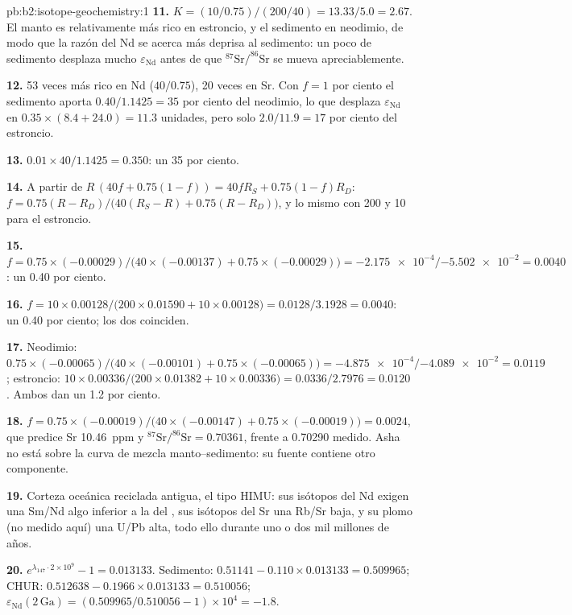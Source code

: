 \begin{solution}{pb:b2:isotope-geochemistry:1}
\textbf{11.} $K = (10/0.75)/(200/40) = 13.33/5.0 = 2.67$. El manto es relativamente
más rico en estroncio, y el sedimento en neodimio, de modo que la razón del Nd se acerca más deprisa al
sedimento: un poco de sedimento desplaza mucho $\varepsilon_{\mathrm{Nd}}$ antes de que
$^{87}\mathrm{Sr}/^{86}\mathrm{Sr}$ se mueva apreciablemente.

\textbf{12.} 53 veces más rico en Nd ($40/0.75$), 20 veces en Sr. Con $f = 1$ por ciento el
sedimento aporta $0.40/1.1425 = 35$ por ciento del neodimio, lo que desplaza
$\varepsilon_{\mathrm{Nd}}$ en $0.35\times(8.4 + 24.0) = 11.3$ unidades, pero solo $2.0/11.9 =
17$ por ciento del estroncio.

\textbf{13.} $0.01\times40/1.1425 = 0.350$: un 35 por ciento.

\textbf{14.} A partir de $R\,(40f + 0.75(1-f)) = 40fR_S + 0.75(1-f)R_D$:
$f = 0.75(R - R_D)/\bigl(40(R_S - R) + 0.75(R - R_D)\bigr)$, y lo mismo con 200
y 10 para el estroncio.

\textbf{15.} $f = 0.75\times(-0.00029)/\bigl(40\times(-0.00137) + 0.75\times(-0.00029)\bigr)
= \num{-2.175e-4}/\num{-5.502e-2} = 0.0040$: un 0.40 por ciento.

\textbf{16.} $f = 10\times0.00128/\bigl(200\times0.01590 + 10\times0.00128\bigr) =
0.0128/3.1928 = 0.0040$: un 0.40 por ciento; los dos coinciden.

\textbf{17.} Neodimio: $0.75\times(-0.00065)/\bigl(40\times(-0.00101) +
0.75\times(-0.00065)\bigr) = \num{-4.875e-4}/\num{-4.089e-2} = 0.0119$; estroncio:
$10\times0.00336/\bigl(200\times0.01382 + 10\times0.00336\bigr) = 0.0336/2.7976 = 0.0120$.
Ambos dan un 1.2 por ciento.

\textbf{18.} $f = 0.75\times(-0.00019)/\bigl(40\times(-0.00147) + 0.75\times(-0.00019)\bigr)
= 0.0024$, que predice Sr \qty{10.46}{ppm} y $^{87}\mathrm{Sr}/^{86}\mathrm{Sr} =
0.70361$, frente a 0.70290 medido. Asha no está sobre la curva de mezcla manto--sedimento:
su fuente contiene otro componente.

\textbf{19.} Corteza oceánica reciclada antigua, el tipo HIMU: sus isótopos del Nd exigen una Sm/Nd
algo inferior a la del , sus isótopos del Sr una Rb/Sr baja, y su
plomo (no medido aquí) una U/Pb alta, todo ello durante uno o dos mil millones de años.

\textbf{20.} $e^{\lambda_{147}\cdot2\times10^9} - 1 = 0.013133$. Sedimento: $0.51141 -
0.110\times0.013133 = 0.509965$; CHUR: $0.512638 - 0.1966\times0.013133 = 0.510056$;
$\varepsilon_{\mathrm{Nd}}(2\,\mathrm{Ga}) = (0.509965/0.510056 - 1)\times10^4 = -1.8$.


\end{solution}
